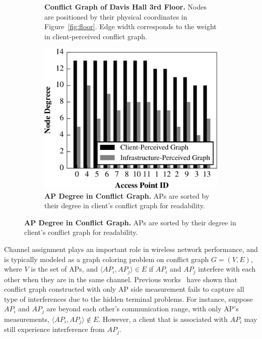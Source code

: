 \begin{figure}[t]
\begin{subfigure}[b]{0.33\textwidth}
    \caption{\textbf{Conflict Graph of Davis Hall 3rd Floor.} Nodes are positioned by their
      physical coordinates in Figure~\ref{fig:floor}. Edge width corresponds to
    the weight in client-perceived conflict graph.}
    \label{fig:conflict}
  \end{subfigure}%
  \begin{subfigure}[b]{0.33\textwidth}
    \includegraphics[width=\textwidth]{./figures/DavisConflictDegree.pdf}
    \caption{\textbf{AP Degree in Conflict Graph.} APs are sorted by their degree in
    client's conflict graph for readability.}
    \label{fig:conflict_degree}
  \end{subfigure}
  \vspace*{\aftercaptiongap}
\end{figure}


Channel assignment plays an important role in wireless network performance, and
is typically modeled as a graph coloring problem on conflict graph $G=(V, E)$,
where $V$ is the set of APs, and $\langle AP_i, AP_j \rangle \in E$ if $AP_i$
and $AP_j$ interfere with each other when they are in the same channel. Previous
works~\cite{mishra2005weighted,mishra2006client} have shown that conflict graph
constructed with only AP side measurement fails to capture all type of interferences
due to the hidden terminal problems. For instance, suppose
$AP_i$ and $AP_j$ are beyond each other's communication range, with only AP's
measurements, $\langle AP_i, AP_j \rangle \notin E$. However, a client that is
associated with $AP_i$ may still experience interference from $AP_j$.

